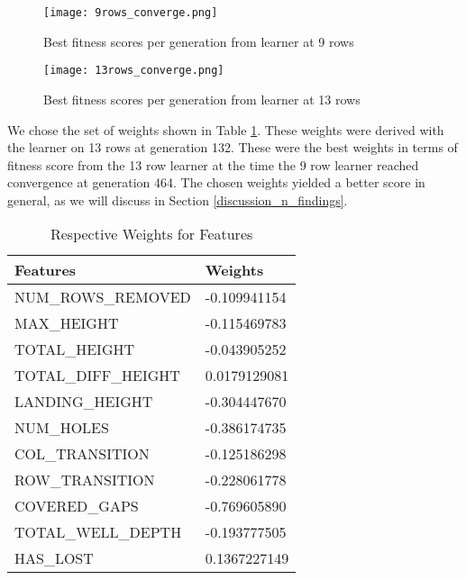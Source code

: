 \documentclass[a4paper,12pt,twocolumn]{article}
\begin{document}
\begin{figure}[H]
    \centering
    \texttt{[image: 9rows\_converge.png]}
    \caption{Best fitness scores per generation from learner at 9 rows}
    \label{score_9rows}
\end{figure}


\begin{figure}[H]
    \centering
    \texttt{[image: 13rows\_converge.png]}
    \caption{Best fitness scores per generation from learner at 13 rows}
    \label{score_13rows}
\end{figure}

We chose the set of weights shown in Table \ref{feature_weights}. These weights
were derived with the learner on 13 rows at generation 132. These were the best
weights in terms of fitness score from the 13 row learner at the time
the 9 row learner reached convergence at generation 464. The chosen weights
yielded a better score in general, as we will discuss in Section \ref{discussion_n_findings}.

\begin{table}[H]
    \centering
    \begin{tabular}{|l|l|}
        \hline
		\textbf{Features}   & \textbf{Weights} \\
        \hline
		NUM\_ROWS\_REMOVED  & -0.109941154     \\
        \hline
		MAX\_HEIGHT         & -0.115469783     \\
        \hline
		TOTAL\_HEIGHT       & -0.043905252     \\
        \hline
		TOTAL\_DIFF\_HEIGHT & 0.0179129081     \\
        \hline
		LANDING\_HEIGHT     & -0.304447670     \\
        \hline
		NUM\_HOLES          & -0.386174735     \\
        \hline
		COL\_TRANSITION     & -0.125186298     \\
        \hline
		ROW\_TRANSITION     & -0.228061778     \\
        \hline
		COVERED\_GAPS       & -0.769605890     \\
        \hline
		TOTAL\_WELL\_DEPTH  & -0.193777505     \\
        \hline
		HAS\_LOST           & 0.1367227149     \\
        \hline
    \end{tabular}
    \caption{Respective Weights for Features}
    \label{feature_weights}
\end{table}
\end{document}
